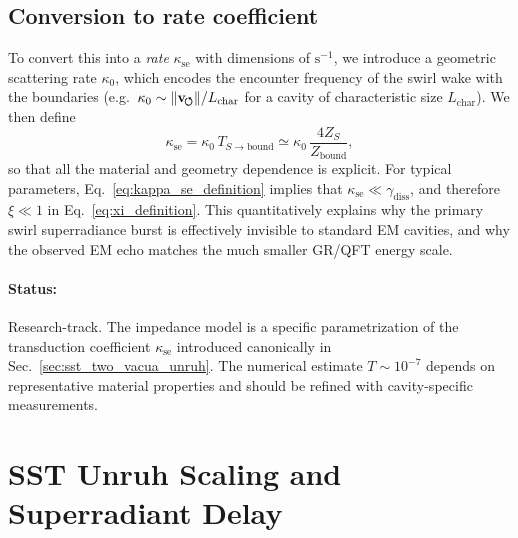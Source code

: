 \subsection{Conversion to rate coefficient}

    To convert this into a \emph{rate} $\kappa_{\text{se}}$ with dimensions of
    $\mathrm{s}^{-1}$, we introduce a geometric scattering rate $\kappa_0$,
    which encodes the encounter frequency of the swirl wake with the boundaries
    (e.g.\ $\kappa_0 \sim \lVert\mathbf{v}_{\!\boldsymbol{\circlearrowleft}}\rVert/L_{\mathrm{char}}$ for a cavity of
    characteristic size $L_{\mathrm{char}}$). We then define
    \begin{equation}
        \kappa_{\text{se}}
        =
        \kappa_0\, T_{S\to \mathrm{bound}}
        \simeq
        \kappa_0\,\frac{4 Z_S}{Z_{\mathrm{bound}}},
        \label{eq:kappa_se_definition}
    \end{equation}
    so that all the material and geometry dependence is explicit. For typical
    parameters, Eq.~\eqref{eq:kappa_se_definition} implies that
    $\kappa_{\text{se}} \ll \gamma_{\mathrm{diss}}$, and therefore
    $\xi \ll 1$ in Eq.~\eqref{eq:xi_definition}. This quantitatively explains
    why the primary swirl superradiance burst is effectively invisible to standard
    EM cavities, and why the observed EM echo matches the much smaller GR/QFT
    energy scale.

    \paragraph*{Status:} Research-track. The impedance model is a specific
        parametrization of the transduction coefficient $\kappa_{\text{se}}$ introduced
        canonically in Sec.~\ref{sec:sst_two_vacua_unruh}. The numerical estimate
        $T \sim 10^{-7}$ depends on representative material properties and should be
        refined with cavity-specific measurements.


\section{SST Unruh Scaling and Superradiant Delay}

